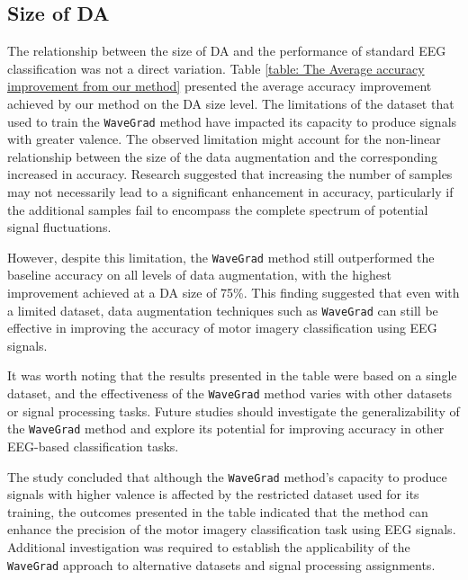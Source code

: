 \documentclass[12pt]{iopart}
\begin{document}
\subsection{Size of DA}
 The relationship between the size of DA and the performance of standard EEG classification was not a direct variation. 
 Table \ref{table: The Average accuracy improvement from our method} presented the average accuracy improvement achieved by our method on the DA size level. The limitations of the dataset that used to train the \texttt{WaveGrad} method have impacted its capacity to produce signals with greater valence. The observed limitation might account for the non-linear relationship between the size of the data augmentation and the corresponding increased in accuracy. Research suggested that increasing the number of samples may not necessarily lead to a significant enhancement in accuracy, particularly if the additional samples fail to encompass the complete spectrum of potential signal fluctuations.


However, despite this limitation, the \texttt{WaveGrad} method still outperformed the baseline accuracy on all levels of data augmentation, with the highest improvement achieved at a DA size of 75\%. This finding suggested that even with a limited dataset, data augmentation techniques such as \texttt{WaveGrad} can still be effective in improving the accuracy of motor imagery classification using EEG signals.

It was worth noting that the results presented in the table were based on a single dataset, and the effectiveness of the \texttt{WaveGrad} method varies with other datasets or signal processing tasks. Future studies should investigate the generalizability of the \texttt{WaveGrad} method and explore its potential for improving accuracy in other EEG-based classification tasks.

The study concluded that although the \texttt{WaveGrad} method's capacity to produce signals with higher valence is affected by the restricted dataset used for its training, the outcomes presented in the table indicated that the method can enhance the precision of the motor imagery classification task using EEG signals. Additional investigation was required to establish the applicability of the \texttt{WaveGrad} approach to alternative datasets and signal processing assignments.


 
\end{document}

